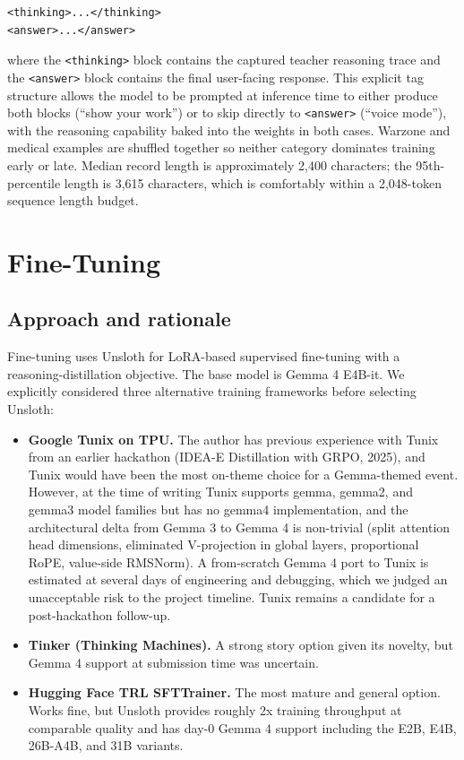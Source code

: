 \documentclass{article}
\theoremstyle{plain}
\theoremstyle{definition}
\theoremstyle{remark}
\begin{document}
\begin{verbatim}
<thinking>...</thinking>
<answer>...</answer>
\end{verbatim}

where the \texttt{<thinking>} block contains the captured teacher reasoning trace and the \texttt{<answer>} block contains the final user-facing response. This explicit tag structure allows the model to be prompted at inference time to either produce both blocks (``show your work'') or to skip directly to \texttt{<answer>} (``voice mode''), with the reasoning capability baked into the weights in both cases. Warzone and medical examples are shuffled together so neither category dominates training early or late. Median record length is approximately 2{,}400 characters; the 95th-percentile length is 3{,}615 characters, which is comfortably within a 2{,}048-token sequence length budget.

\section{Fine-Tuning}

\subsection{Approach and rationale}

Fine-tuning uses Unsloth for LoRA-based supervised fine-tuning with a reasoning-distillation objective. The base model is Gemma 4 E4B-it. We explicitly considered three alternative training frameworks before selecting Unsloth:

\begin{itemize}
\item \textbf{Google Tunix on TPU.} The author has previous experience with Tunix from an earlier hackathon (IDEA-E Distillation with GRPO, 2025), and Tunix would have been the most on-theme choice for a Gemma-themed event. However, at the time of writing Tunix supports gemma, gemma2, and gemma3 model families but has no gemma4 implementation, and the architectural delta from Gemma 3 to Gemma 4 is non-trivial (split attention head dimensions, eliminated V-projection in global layers, proportional RoPE, value-side RMSNorm). A from-scratch Gemma 4 port to Tunix is estimated at several days of engineering and debugging, which we judged an unacceptable risk to the project timeline. Tunix remains a candidate for a post-hackathon follow-up.
\item \textbf{Tinker (Thinking Machines).} A strong story option given its novelty, but Gemma 4 support at submission time was uncertain.
\item \textbf{Hugging Face TRL SFTTrainer.} The most mature and general option. Works fine, but Unsloth provides roughly 2x training throughput at comparable quality and has day-0 Gemma 4 support including the E2B, E4B, 26B-A4B, and 31B variants.
\end{itemize}
\end{document}
